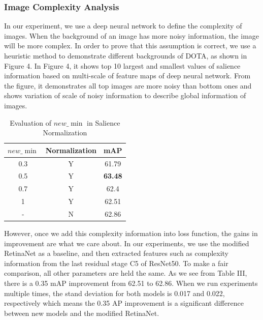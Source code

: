 \documentclass[conference]{IEEEtran}
\begin{document}
    \subsubsection{Image Complexity Analysis}
    In our experiment, we use a deep neural network to define the complexity of images. When the background of an image has more noisy information, the image will be more complex. In order to prove that this assumption is correct, we use a heuristic method to demonstrate different backgrounds of DOTA, as shown in Figure 4. In Figure 4, it shows top 10 largest and smallest values of salience information based on multi-scale of feature maps of deep neural network. From the figure, it demonstrates all top images are more noisy than bottom ones and shows variation of scale of noisy information to describe global information of images.
        \begin{table}[htbp]
    	\caption{Evaluation of \(new\_\min\) in Salience Normalization}
    	\begin{center}
    	\begin{tabular}{|c|c|c|}
    	\hline

    	\textbf{\(new\_\min\)}&\textbf{Normalization}&\textbf{mAP} \\ \hline
    	0.3 & Y & 61.79 \\
    	0.5 & Y & \textbf{63.48} \\
    	0.7 & Y & 62.4 \\
    	1 & Y & 62.51 \\ 
    	- & N & 62.86 \\\hline
    	\end{tabular}
    	\label{tab:final}
    	\end{center}
    \end{table}
    
    However, once we add this complexity information into loss function, the gains in improvement are what we care about. In our experiments, we use the modified RetinaNet\cite{lin2017focal} as a baseline, and then extracted features such as complexity information from the last residual stage C5 of ResNet50\cite{he2016deep}. To make a fair comparison, all other parameters are held the same. As we see from Table III, there is a 0.35 mAP improvement from 62.51 to 62.86. When we run experiments multiple times, the stand deviation for both models is 0.017 and 0.022, respectively which means the 0.35 AP improvement is a significant difference between new models and the modified RetinaNet\cite{lin2017focal}. 
   	
\end{document}
